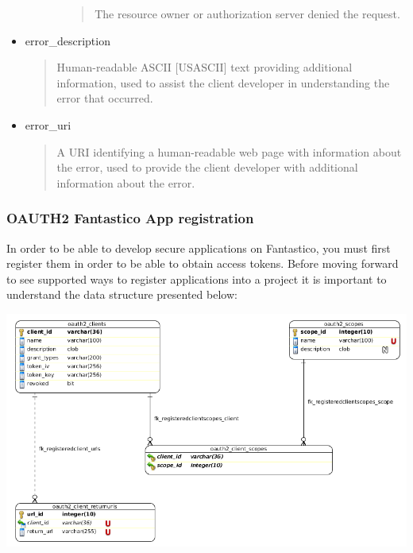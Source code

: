 \documentclass[letterpaper,10pt,english]{sphinxmanual}
\begin{document}
\begin{itemize}
\begin{itemize}
\begin{itemize}
\begin{quote}
The resource owner or authorization server denied the request.
\end{quote}

\end{itemize}

\end{itemize}

\item {} 
error\_description
\begin{quote}

Human-readable ASCII {[}USASCII{]} text providing additional information, used to assist the client developer in
understanding the error that occurred.
\end{quote}

\item {} 
error\_uri
\begin{quote}

A URI identifying a human-readable web page with information about the error, used to provide the client developer
with additional information about the error.
\end{quote}

\end{itemize}


\subsubsection{OAUTH2 Fantastico App registration}
\label{features/oauth2/app_registration::doc}\label{features/oauth2/app_registration:oauth2-fantastico-app-registration}
In order to be able to develop secure applications on Fantastico, you must first register them in order to be able to obtain
access tokens. Before moving forward to see supported ways to register applications into a project it is important to understand
the data structure presented below:

\includegraphics{clients_storage.png}
\end{document}
